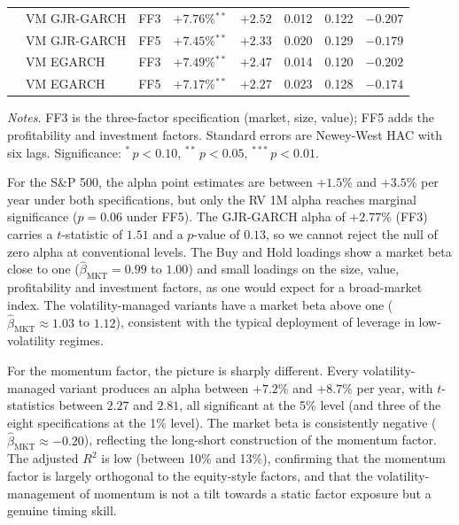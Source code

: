 \documentclass[12pt, a4paper]{article}
\begin{document}
\begin{table}[H]
\begin{tabular}{lllccccc}
      & VM GJR-GARCH   & FF3 & $+7.76$\%$^{**}$  & $+2.52$ & 0.012 & 0.122 & $-0.207$ \\
      & VM GJR-GARCH   & FF5 & $+7.45$\%$^{**}$  & $+2.33$ & 0.020 & 0.129 & $-0.179$ \\
      & VM EGARCH      & FF3 & $+7.49$\%$^{**}$  & $+2.47$ & 0.014 & 0.120 & $-0.202$ \\
      & VM EGARCH      & FF5 & $+7.17$\%$^{**}$  & $+2.27$ & 0.023 & 0.128 & $-0.174$ \\
    \bottomrule
  \end{tabular}
  \begin{minipage}{\textwidth}
    \vspace{2pt}
    \footnotesize\textit{Notes.} FF3 is the three-factor specification (market, size,
    value); FF5 adds the profitability and investment factors. Standard errors are
    Newey-West HAC with six lags. Significance: $^{*}\, p<0.10$, $^{**}\, p<0.05$,
    $^{***}\, p<0.01$.
  \end{minipage}
\end{table}

For the S\&P 500, the alpha point estimates are between $+1.5$\% and $+3.5$\% per year
under both specifications, but only the RV 1M alpha reaches marginal significance
($p = 0.06$ under FF5). The GJR-GARCH alpha of $+2.77$\% (FF3) carries a $t$-statistic of
$1.51$ and a $p$-value of $0.13$, so we cannot reject the null of zero alpha at
conventional levels. The Buy and Hold loadings show a market beta close to one
($\hat\beta_{\mathrm{MKT}} = 0.99$ to $1.00$) and small loadings on the size, value,
profitability and investment factors, as one would expect for a broad-market index. The
volatility-managed variants have a market beta above one
($\hat\beta_{\mathrm{MKT}} \approx 1.03$ to $1.12$), consistent with the typical
deployment of leverage in low-volatility regimes.

For the momentum factor, the picture is sharply different. Every volatility-managed
variant produces an alpha between $+7.2$\% and $+8.7$\% per year, with $t$-statistics
between $2.27$ and $2.81$, all significant at the 5\% level (and three of the eight
specifications at the 1\% level). The market beta is consistently negative
($\hat\beta_{\mathrm{MKT}} \approx -0.20$), reflecting the long-short construction of
the momentum factor. The adjusted $R^2$ is low (between 10\% and 13\%), confirming that
the momentum factor is largely orthogonal to the equity-style factors, and that the
volatility-management of momentum is not a tilt towards a static factor exposure but a
genuine timing skill.
\end{document}
